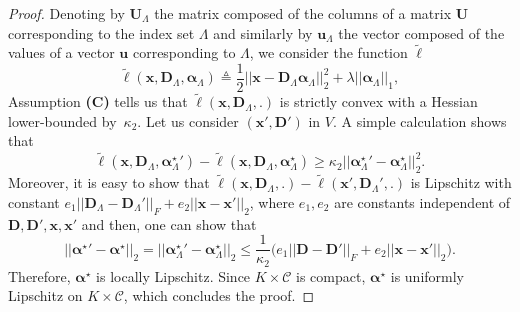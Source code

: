 \documentclass[twoside,11pt]{article}
\def\x{{\mathbf x}}
\def\tildel{\tilde{\ell}}
\def\alphab{{\boldsymbol\alpha}}
\def\D{{\mathbf D}}
\def\C{{\mathcal C}}
\def\u{{\mathbf u}}
\def\U{{\mathbf U}}
\def\u{{\mathbf u}}
\def\defin{\stackrel{\vartriangle}{=}}
\begin{document}
\begin{proof}
Denoting by $\U_{\Lambda}$ the matrix composed of the columns of a matrix $\U$ 
corresponding to the index set $\Lambda$ and similarly by $\u_\Lambda$ the vector composed of the values of a vector $\u$ corresponding to $\Lambda$, 
we consider the function $\tildel$ 
\begin{displaymath}
   \tildel(\x,\D_\Lambda,\alphab_\Lambda) \defin \frac{1}{2}||\x-\D_\Lambda\alphab_\Lambda||_2^2+\lambda||\alphab_\Lambda||_1,
\end{displaymath}
Assumption {\bf (C)} tells us that $\tildel(\x,\D_\Lambda,.)$ is strictly convex with
a Hessian lower-bounded by~$\kappa_2$. Let us consider $(\x',\D')$ in $V$. A simple calculation shows that 
\begin{displaymath}
   \tildel(\x,\D_\Lambda,{\alphab^\star_\Lambda}')-\tildel(\x,\D_\Lambda,\alphab^\star_\Lambda)
   \geq \kappa_2 ||{\alphab^\star_\Lambda}'-\alphab^\star_\Lambda||_2^2.
\end{displaymath}
Moreover, it is easy to show that $\tildel(\x,\D_\Lambda,.)-\tildel(\x',\D_\Lambda',.)$ is Lipschitz with constant  
 $e_1||\D_\Lambda-\D_\Lambda'||_F+e_2||\x-\x'||_2$, where $e_1,e_2$ are constants independent of
 $\D,\D',\x,\x'$ and then, one can show that 
\begin{displaymath}
   ||{\alphab^\star}'-\alphab^\star||_2 = ||{\alphab^\star_\Lambda}'-\alphab^\star_\Lambda||_2 \leq \frac{1}{\kappa_2}\big(e_1||\D-\D'||_F + e_2||\x-\x'||_2\big).
\end{displaymath}
Therefore, $\alphab^\star$ is locally Lipschitz. Since $K \times \C$ is compact, $\alphab^\star$ is uniformly Lipschitz on $K \times \C$, which concludes the proof. 
\end{proof}
\end{document}
